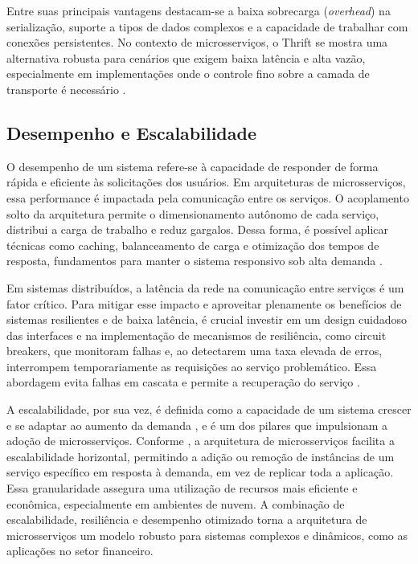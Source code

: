 Entre suas principais vantagens destacam-se a baixa sobrecarga (\textit{overhead}) na serialização, suporte a tipos de dados complexos e a capacidade de trabalhar com conexões persistentes. No contexto de microsserviços, o Thrift se mostra uma alternativa robusta para cenários que exigem baixa latência e alta vazão, especialmente em implementações onde o controle fino sobre a camada de transporte é necessário \cite{apache_apache_nodate}.

\subsection{Desempenho e Escalabilidade}

O desempenho de um sistema refere-se à capacidade de responder de forma rápida e eficiente às solicitações dos usuários. Em arquiteturas de microsserviços, essa performance é impactada pela comunicação entre os serviços. O acoplamento solto da arquitetura permite o dimensionamento autônomo de cada serviço, distribui a carga de trabalho e reduz gargalos. Dessa forma, é possível aplicar técnicas como caching, balanceamento de carga e otimização dos tempos de resposta, fundamentos para manter o sistema responsivo sob alta demanda \cite{newman_building_2022}.

Em sistemas distribuídos, a latência da rede na comunicação entre serviços é um fator crítico. Para mitigar esse impacto e aproveitar plenamente os benefícios de sistemas resilientes e de baixa latência, é crucial investir em um design cuidadoso das interfaces e na implementação de mecanismos de resiliência, como circuit breakers, que monitoram falhas e, ao detectarem uma taxa elevada de erros, interrompem temporariamente as requisições ao serviço problemático. Essa abordagem evita falhas em cascata e permite a recuperação do serviço \cite[p. 131]{kleppmann_designing_2017}. 

A escalabilidade, por sua vez, é definida como a capacidade de um sistema crescer e se adaptar ao aumento da demanda \cite[p. 60]{fowler_microsservicos_2022}, e é um dos pilares que impulsionam a adoção de microsserviços. Conforme \cite{newman_building_2022}, a arquitetura de microsserviços facilita a escalabilidade horizontal, permitindo a adição ou remoção de instâncias de um serviço específico em resposta à demanda, em vez de replicar toda a aplicação. Essa granularidade assegura uma utilização de recursos mais eficiente e econômica, especialmente em ambientes de nuvem. A combinação de escalabilidade, resiliência e desempenho otimizado torna a arquitetura de microsserviços um modelo robusto para sistemas complexos e dinâmicos, como as aplicações no setor financeiro.
\vspace{\fill}
